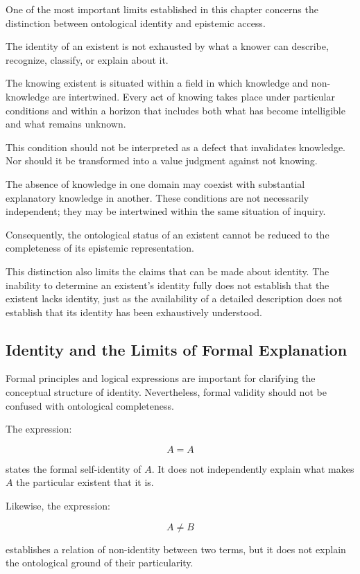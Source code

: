 One of the most important limits established in this chapter concerns the distinction between ontological identity and epistemic access.

The identity of an existent is not exhausted by what a knower can describe, recognize, classify, or explain about it.

The knowing existent is situated within a field in which knowledge and non-knowledge are intertwined. Every act of knowing takes place under particular conditions and within a horizon that includes both what has become intelligible and what remains unknown.

This condition should not be interpreted as a defect that invalidates knowledge. Nor should it be transformed into a value judgment against not knowing.

The absence of knowledge in one domain may coexist with substantial explanatory knowledge in another. These conditions are not necessarily independent; they may be intertwined within the same situation of inquiry.

Consequently, the ontological status of an existent cannot be reduced to the completeness of its epistemic representation.

This distinction also limits the claims that can be made about identity. The inability to determine an existent's identity fully does not establish that the existent lacks identity, just as the availability of a detailed description does not establish that its identity has been exhaustively understood.

\subsection{Identity and the Limits of Formal Explanation}

Formal principles and logical expressions are important for clarifying the conceptual structure of identity. Nevertheless, formal validity should not be confused with ontological completeness.

The expression:

\[
A = A
\]

states the formal self-identity of \(A\). It does not independently explain what makes \(A\) the particular existent that it is.

Likewise, the expression:

\[
A \neq B
\]

establishes a relation of non-identity between two terms, but it does not explain the ontological ground of their particularity.

